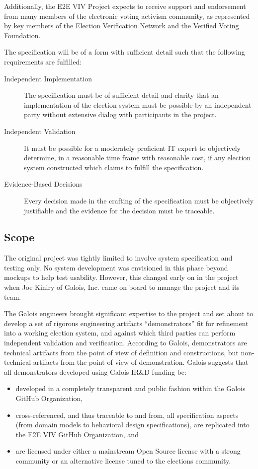 Additionally, the E2E VIV Project expects to receive support and
endorsement from many members of the electronic voting activism
community, as represented by key members of the Election Verification
Network and the Verified Voting Foundation.

The specification will be of a form with sufficient detail such that
the following requirements are fulfilled:
\begin{description}
\item[Independent Implementation] The specification must be of
  sufficient detail and clarity that an implementation of the election
  system must be possible by an independent party without extensive
  dialog with participants in the project.
\item[Independent Validation] It must be possible for a moderately
  proficient IT expert to objectively determine, in a reasonable time
  frame with reasonable cost, if any election system constructed which
  claims to fulfill the specification.
\item[Evidence-Based Decisions] Every decision made in the crafting of
  the specification must be objectively justifiable and the evidence
  for the decision must be traceable. 
\end{description}

\subsection{Scope}
\label{sec:scope}

The original project was tightly limited to involve system
specification and testing only. No system development was envisioned
in this phase beyond mockups to help test usability. However, this
changed early on in the project when Joe Kiniry of Galois, Inc. came
on board to manage the project and its team. 

The Galois engineers brought significant expertise to the project and
set about to develop a set of rigorous engineering artifacts
``demonstrators'' fit for refinement into a working election system, and
against which third parties can perform independent validation and
verification. According to Galois, demonstrators are technical
artifacts from the point of view of definition and constructions, but
non-technical artifacts from the point of view of
demonstration. Galois suggests that all demonstrators developed using
Galois IR\&D funding be: 
\begin{itemize}
\item developed in a completely transparent and public fashion within
  the Galois GitHub Organization, 
\item cross-referenced, and thus traceable to and from, all
  specification aspects (from domain models to behavioral design
  specifications), are replicated into the E2E VIV GitHub
  Organization, and
\item are licensed under either a mainstream Open Source license with
  a strong community or an alternative license tuned to the elections
  community.
\end{itemize}

